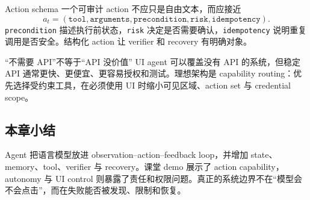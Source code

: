 \begin{importantbox}{Action schema}
一个可审计 action 不应只是自由文本，而应接近
\[
a_t=(\texttt{tool},\texttt{arguments},\texttt{precondition},\texttt{risk},\texttt{idempotency}).
\]
\texttt{precondition} 描述执行前状态，\texttt{risk} 决定是否需要确认，\texttt{idempotency} 说明重复调用是否安全。结构化 action 让 verifier 和 recovery 有明确对象。
\end{importantbox}


\begin{warningbox}{“不需要 API”不等于“API 没价值”}
UI agent 可以覆盖没有 API 的系统，但稳定 API 通常更快、更便宜、更容易授权和测试。理想架构是 capability routing：优先选择受约束工具，在必须使用 UI 时缩小可见区域、action set 与 credential scope。
\end{warningbox}

\subsection{本章小结}

Agent 把语言模型放进 observation--action--feedback loop，并增加 state、memory、tool、verifier 与 recovery。课堂 demo 展示了 action capability，autonomy 与 UI control 则暴露了责任和权限问题。真正的系统边界不在“模型会不会点击”，而在失败能否被发现、限制和恢复。

